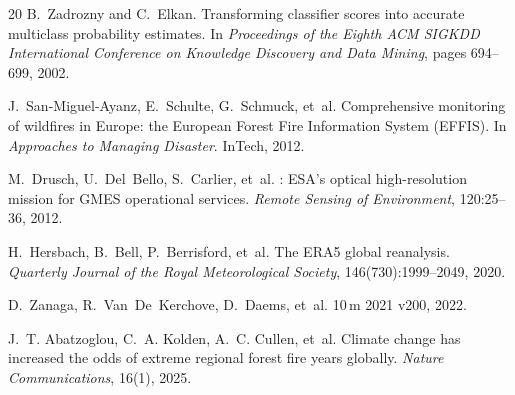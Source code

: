 \documentclass[11pt]{article}
\begin{document}
\begin{thebibliography}{20}
B.~Zadrozny and C.~Elkan.
\newblock Transforming classifier scores into accurate multiclass probability
  estimates.
\newblock In \emph{Proceedings of the Eighth ACM SIGKDD International
  Conference on Knowledge Discovery and Data Mining}, pages 694--699, 2002.

J.~San-Miguel-Ayanz, E.~Schulte, G.~Schmuck, et~al.
\newblock Comprehensive monitoring of wildfires in {Europe}: the {European
  Forest Fire Information System (EFFIS)}.
\newblock In \emph{Approaches to Managing Disaster}. InTech, 2012.

M.~Drusch, U.~Del~Bello, S.~Carlier, et~al.
: {ESA}'s optical high-resolution mission for {GMES}
  operational services.
\newblock \emph{Remote Sensing of Environment}, 120:25--36, 2012.

H.~Hersbach, B.~Bell, P.~Berrisford, et~al.
\newblock The {ERA5} global reanalysis.
\newblock \emph{Quarterly Journal of the Royal Meteorological Society},
  146(730):1999--2049, 2020.

D.~Zanaga, R.~Van~De~Kerchove, D.~Daems, et~al.
 10\,m 2021 v200, 2022.

J.~T. Abatzoglou, C.~A. Kolden, A.~C. Cullen, et~al.
\newblock Climate change has increased the odds of extreme regional forest
  fire years globally.
\newblock \emph{Nature Communications}, 16(1), 2025.

\end{thebibliography}
\end{document}
